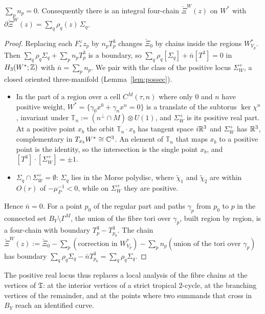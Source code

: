 \begin{proposition}\label{lem:F}
$\sum_pn_p=0$. Consequently there is an integral four-chain $\check\Xi^W(z)$ on $W^*$ with $\partial\check\Xi^W(z)=\sum_q
\rho_q(z)\,\Sigma_q$.
\end{proposition}

\begin{proof}
Replacing each $F^\vee_*z_p$ by $n_pT^3_p$ changes $\check\Xi_0$ by chains inside the regions $W^*_{V_p}$. Then
$\sum_q\rho_q\Sigma_q+\sum_pn_pT^3_p$ is a boundary, so $\sum_q\rho_q[\Sigma_q]+\bar n[T^3]=0$ in $H_3(W^*;\mathbb Z)$ with
$\bar n=\sum_pn_p$. We pair with the class of the positive locus $\Sigma^+_W$, a closed oriented three-manifold
(Lemma~\ref{lem:possec}).
\begin{itemize}
\item In the part of a region over a cell $C^M(\tau,n)$ where only $0$ and $n$ have positive weight,
$W^*=\{\gamma_0x^0+\gamma_nx^n=0\}$ is a translate of the subtorus $\ker\chi^n$, invariant under $\mathbb T_n:=(n^\perp\cap M)
\otimes U(1)$, and $\Sigma^+_W$ is its positive real part. At a positive point $x_b$ the orbit $\mathbb T_n\cdot x_b$ has
tangent space $i\mathbb R^3$ and $\Sigma^+_W$ has $\mathbb R^3$, complementary in $T_{x_b}W^*\cong\mathbb C^3$. An element of $\mathbb T_n$ that maps
$x_b$ to a positive point is the identity, so the intersection is the single point $x_b$, and $[T^3]\cdot[\Sigma^+_W]=\pm1$.
\item $\Sigma_q\cap\Sigma^+_W=\emptyset$: $\Sigma_q$ lies in the Morse polydisc, where $\tilde\chi_1$ and $\tilde\chi_2$ are within
$O(r)$ of $-\mu_P^{-1}<0$, while on $\Sigma^+_W$ they are positive.
\end{itemize}
Hence $\bar n=0$. For a point $p_0$ of the regular part and paths $\gamma_p$ from $p_0$ to $p$ in the connected set
$B_Y\setminus\Gamma^M$, the union of the fibre tori over $\gamma_p$, built region by region, is a four-chain with boundary
$T^3_p-T^3_{p_0}$. The chain $\check\Xi^W(z):=\check\Xi_0-\sum_p(\text{correction in }W^*_{V_p})-\sum_pn_p(\text{union of the
tori over }\gamma_p)$ has boundary $\sum_q\rho_q\Sigma_q-\bar nT^3_{p_0}=\sum_q\rho_q\Sigma_q$.
\end{proof}

The positive real locus thus replaces a local analysis of the fibre chains at the vertices of $\mathfrak T$: at the interior
vertices of a strict tropical $2$-cycle, at the branching vertices of the remainder, and at the points where two
summands that cross in $B_Y$ reach an identified curve.

